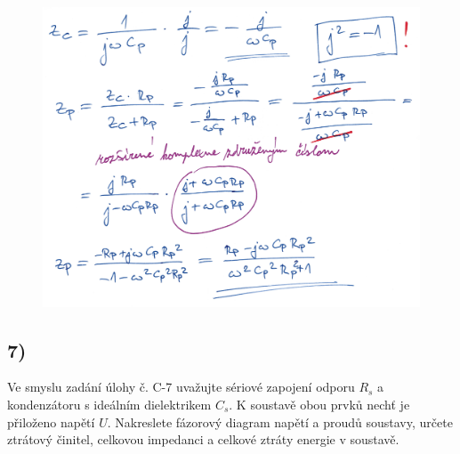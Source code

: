 \newpage

\begin{figure}[h]
    \centering
    \includegraphics*[width=\textwidth]{images/diel6_1.jpg}
\end{figure}

\newpage


\subsection*{7)}
Ve smyslu zadání úlohy č. C-7 uvažujte sériové zapojení odporu $R_s$ a kondenzátoru s ideálním dielektrikem $C_s$. K soustavě obou prvků nechť je přiloženo napětí $U$. Nakreslete fázorový diagram napětí a proudů soustavy, určete ztrátový činitel, celkovou impedanci a celkové ztráty energie v soustavě.

